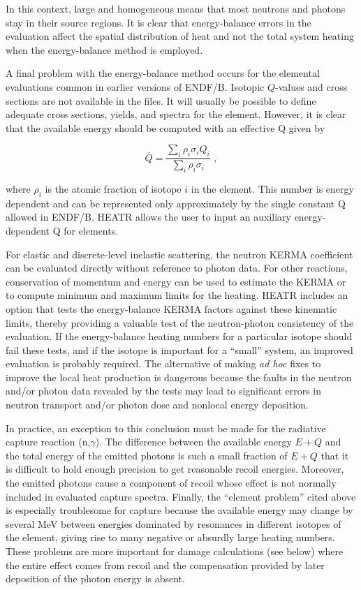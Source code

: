 In this context, large and homogeneous means that most neutrons and
photons stay in their source regions.  It is clear that energy-balance
errors in the evaluation affect the spatial distribution of heat and
not the total system heating when the energy-balance method is
employed.

A final problem with the energy-balance method occurs for the
elemental evaluations common in earlier
versions of ENDF/B.  Isotopic $Q$-values and cross sections
are not available in the files.  It will usually be possible to define
adequate cross sections, yields, and spectra for the element.  However,
it is clear that the available energy should be computed with an
effective Q given by

\begin{equation}
   \overline{Q}=\frac{\displaystyle\sum_i\rho_i\sigma_iQ_i}
      {\displaystyle\sum_i\rho_i\sigma_i}\,\,,
\end{equation}

\noindent
where $\rho_i$ is the atomic fraction of isotope $i$ in the element.
This number is energy dependent and can be represented only
approximately by the single constant Q allowed
in ENDF/B.  HEATR allows the user to input an auxiliary
energy-dependent Q for elements.

For elastic and discrete-level inelastic scattering, the neutron
KERMA coefficient can be evaluated directly without reference to
photon data.  For other reactions, conservation of momentum and
energy can be used to estimate the KERMA or to compute minimum and
maximum limits for the heating.  HEATR includes an option that tests
the energy-balance KERMA factors against these kinematic limits,
 thereby providing a valuable test
of the neutron-photon consistency of the evaluation.  If the
energy-balance heating numbers for a particular isotope should
fail these tests, and if the isotope is important for a ``small''
system, an improved evaluation is probably required.  The
alternative of making {\it ad hoc} fixes to improve the local heat
production is dangerous because the faults in the neutron and/or photon
data revealed by the tests may lead to significant errors in neutron
transport and/or photon dose and nonlocal energy deposition.

In practice, an exception to this conclusion must be made for the
radiative capture reaction (n,$\gamma$).  The difference between the
available energy $E{+}Q$ and the total energy of the emitted photons is
such a small fraction of $E{+}Q$ that it is difficult to hold enough
precision to get reasonable recoil energies.  Moreover, the emitted
photons cause a component of recoil whose effect is not normally
included in evaluated capture spectra.  Finally, the ``element
problem'' cited above is especially troublesome for capture because
the available energy may change by several MeV between energies
dominated by resonances in different isotopes of the element, giving
rise to many negative or absurdly large heating numbers.  These
problems are more important for damage calculations (see below) where
the entire effect comes from recoil and the compensation provided by
later deposition of the photon energy is absent.

